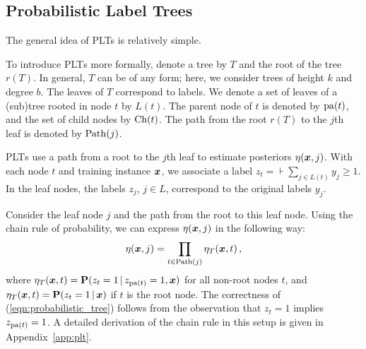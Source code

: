 \documentclass{article}
\newcommand{\prob}{\mathbf{P}}
\newcommand{\Algo}[1]{\textsc{#1}}
\newcommand{\sectionBefore}{-0pt}
\newcommand{\sectionAfter}{-0pt}
\begin{document}
\vspace{\sectionBefore}
\subsection{Probabilistic Label Trees}
\vspace{\sectionAfter}

The general idea of PLTs is relatively simple. 

To introduce \Algo{PLT}s more formally, denote a tree by $T$ and the root of the tree $r(T)$. In general, $T$ can be of any form; here, we consider trees of height $k$ and degree $b$. 
The leaves of $T$ correspond to labels. We denote a set of leaves of a (sub)tree rooted in node $t$ by $L(t)$. %
The parent node of $t$ is denoted by $\mathrm{pa}(t)$, and the set of child nodes by $\mathrm{Ch}(t)$. The path from the root $r(T)$ to the $j$\/th leaf is denoted by $\mathrm{Path}(j)$. %

\Algo{PLT}s use a path from a root to the $j$\/th leaf to estimate posteriors $\eta(\boldsymbol{x}, j)$. %
With each node $t$ and training instance $\boldsymbol{x}$, we associate a label $z_t = \assert{\textstyle \sum_{j \in L(t)} y_j \ge 1}$.
In the leaf nodes, the labels $z_j$, $j \in L$, correspond to the original labels $y_j$.

Consider the leaf node $j$ and the path from the root to this leaf node. Using the chain rule of probability, we can express $\eta(\boldsymbol{x}, j)$ in the following way:
\begin{equation}
\eta(\boldsymbol{x}, j) = \prod_{t \in \mathrm{Path}(j)} \eta_T(\boldsymbol{x}, t)\,,
\label{eqn:probabilistic_tree}
\end{equation}
where $\eta_T(\bx, t) = \prob(z_t = 1 \given z_{\pa{t}} =1, \bx)$ for all non-root nodes $t$, and $\eta_T(\bx, t) = \prob(z_t = 1 \given \bx)$ if $t$ is the root node. 
The correctness of (\ref{eqn:probabilistic_tree}) follows from the observation that $z_{t} = 1$ implies $z_{\mathrm{pa}(t)} = 1$. A detailed derivation of the chain rule in this setup is given in Appendix~\ref{app:plt}.
\end{document}
